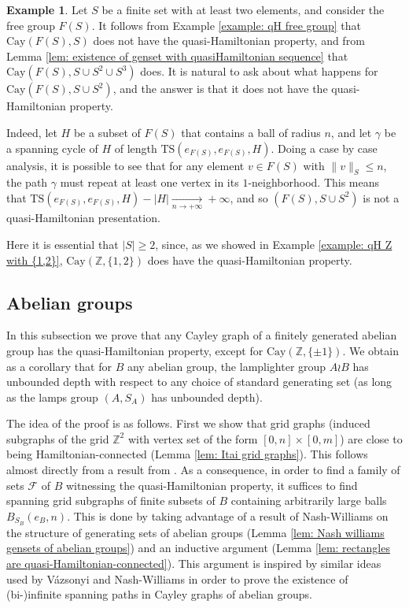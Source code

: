 \documentclass[reqno,oneside]{amsart}
\newcommand{\cay}[2]{\mathrm{Cay}(#1,#2)}
\newcommand{\Z}{\mathbb{Z}}
\newcommand{\TS}[3]{\mathrm{TS}\left(#1,#2,#3\right)}
\theoremstyle{plain}
\theoremstyle{definition}
\newtheorem{exmp}[thm]{Example} %
\begin{document}
\begin{exmp} Let $S$ be a finite set with at least two elements, and consider the free group $F(S)$. It follows from Example \ref{example: qH free group} that $\cay{F(S)}{S}$ does not have the quasi-Hamiltonian property, and from Lemma \ref{lem: existence of genset with quasiHamiltonian sequence} that $\cay{F(S)}{S\cup S^2 \cup S^3}$ does. It is natural to ask about what happens for $\cay{F(S)}{S\cup S^2}$, and the answer is that it does not have the quasi-Hamiltonian property.
	
	Indeed, let $H$ be a subset of $F(S)$ that contains a ball of radius $n$, and let $\gamma$ be a spanning cycle of $H$ of length $\TS{e_{F(S)}}{e_{F(S)}}{H}$. Doing a case by case analysis, it is possible to see that for any element $v\in F(S)$ with $\|v\|_S\le n$, the path $\gamma$ must repeat at least one vertex in its $1$-neighborhood. This means that  $\TS{e_{F(S)}}{e_{F(S)}}{H}-|H| \xrightarrow[n \to +\infty]{} +\infty$, and so $(F(S),S\cup S^2)$ is not a quasi-Hamiltonian presentation.

	Here it is essential that $|S|\ge 2$, since, as we showed in Example \ref{example: qH Z with {1,2}}, $\cay{\Z}{\{1,2\}}$ does have the quasi-Hamiltonian property.
\end{exmp}
\subsection{Abelian groups}\label{subsection: abelian groups}
In this subsection we prove that any Cayley graph of a finitely generated abelian group has the quasi-Hamiltonian property, except for $\cay{\Z}{\{\pm 1\}}$. We obtain as a corollary that for $B$ any abelian group, the lamplighter group $A\wr B$ has unbounded depth with respect to any choice of standard generating set (as long as the lamps group $(A,S_A)$ has unbounded depth).



The idea of the proof is as follows. First we show that grid graphs (induced subgraphs of the grid $\Z^2$ with vertex set of the form $[0,n]\times [0,m]$) are close to being Hamiltonian-connected (Lemma \ref{lem: Itai grid graphs}). This follows almost directly from a result from \cite{ItaiPapadimitriouSzwarcfiter1982}. As a consequence, in order to find a family of sets $\mathcal{F}$ of $B$ witnessing the quasi-Hamiltonian property, it suffices to find spanning grid subgraphs of finite subsets of $B$ containing arbitrarily large balls $B_{S_B}(e_B,n)$. This is done by taking advantage of a result of Nash-Williams on the structure of generating sets of abelian groups (Lemma \ref{lem: Nash williams gensets of abelian groups}) and an inductive argument (Lemma \ref{lem: rectangles are quasi-Hamiltonian-connected}). This argument is inspired by similar ideas used by Vázsonyi \cite{Vazsonyi1939} and Nash-Williams \cite{NashWilliams1959} in order to prove the existence of (bi-)infinite spanning paths in Cayley graphs of abelian groups.
\end{document}

